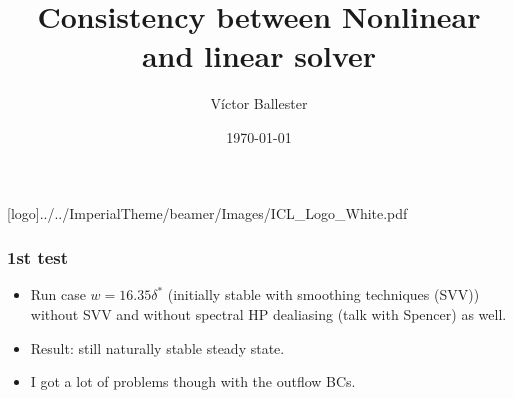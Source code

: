 \documentclass[
	aspectratio=169, %
	t, %
	onlytextwidth, %
	10pt, %
]{beamer}
\title{Consistency between Nonlinear and linear solver} %
\subtitle{} %
\author{Víctor Ballester} %
\date{\today} %
\def\imagefolder{../../ImperialTheme/beamer/Images}
\begin{document}
\begingroup
{} %
[logo]{\imagefolder/ICL_Logo_White.pdf} %
\frame[plain, s]{\titlepage} %
\endgroup


\begin{frame}
	\frametitle{1st test}
	\begin{itemize}
		\item Run case $w = 16.35\delta^*$ (initially stable with smoothing techniques (SVV)) without SVV and without spectral HP dealiasing (talk with Spencer) as well.
		\item Result: still naturally stable steady state.	
		\item I got a lot of problems though with the outflow BCs.
	\end{itemize}
\end{frame}
\end{document}
